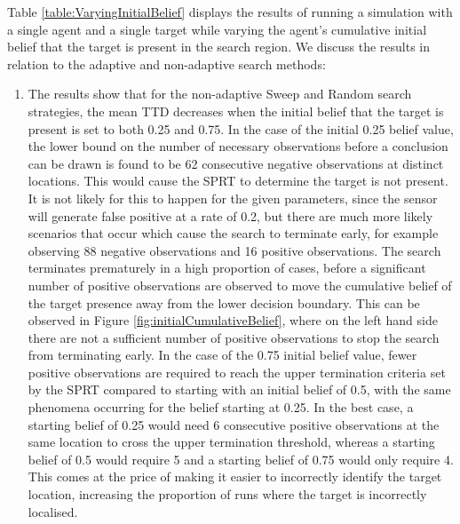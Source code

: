 Table \ref{table:VaryingInitialBelief} displays the results of running a simulation with a single agent and a single target while varying the agent's cumulative initial belief that the target is present in the search region. We discuss the results in relation to the adaptive and non-adaptive search methods:
\begin{enumerate}
    \item The results show that for the non-adaptive Sweep and Random search strategies, the mean TTD decreases when the initial belief that the target is present is set to both 0.25 and 0.75. In the case of the initial 0.25 belief value, the lower bound on the number of necessary observations before a conclusion can be drawn is found to be 62 consecutive negative observations at distinct locations. This would cause the SPRT to determine the target is not present. It is not likely for this to happen for the given parameters, since the sensor will generate false positive at a rate of 0.2, but there are much more likely scenarios that occur which cause the search to terminate early, for example observing 88 negative observations and 16 positive observations.
    The search terminates prematurely in a high proportion of cases, before a significant number of positive observations are observed to move the cumulative belief of the target presence away from the lower decision boundary. This can be observed in Figure \ref{fig:initialCumulativeBelief}, where on the left hand side there are not a sufficient number of positive observations to stop the search from terminating early. In the case of the 0.75 initial belief value, fewer positive observations are required to reach the upper termination criteria set by the SPRT compared to starting with an initial belief of 0.5, with the same phenomena occurring for the belief starting at 0.25. In the best case, a starting belief of 0.25 would need 6 consecutive positive observations at the same location to cross the upper termination threshold, whereas a starting belief of 0.5 would  require 5 and a starting belief of 0.75 would only require 4. This comes at the price of making it easier to incorrectly identify the target location, increasing the proportion of runs where the target is incorrectly localised. 
    

\end{enumerate}

